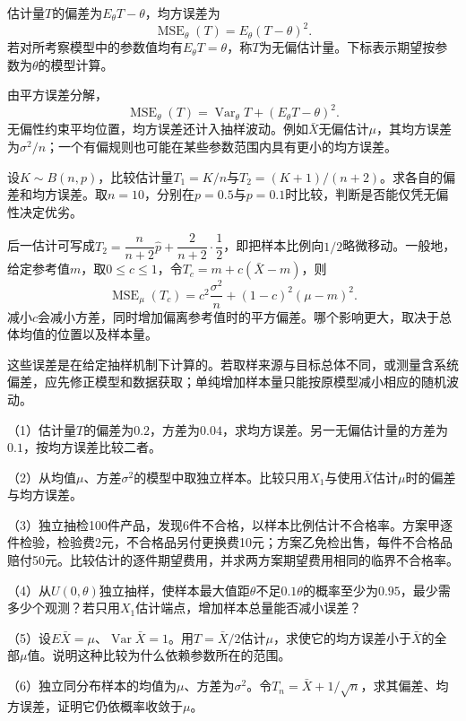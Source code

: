 \begin{definition}
估计量\(T\)的{\heiti 偏差}为\(E_\theta T-\theta\)，{\heiti 均方误差}为
\[
 \operatorname{MSE}_\theta(T)=E_\theta(T-\theta)^2.
\]
若对所考察模型中的参数值均有\(E_\theta T=\theta\)，称\(T\)为{\heiti 无偏估计量}。下标表示期望按参数为\(\theta\)的模型计算。
\end{definition}

由平方误差分解，
\begin{equation}\label{eq:prob-bias-variance}
 \operatorname{MSE}_\theta(T)=\operatorname{Var}_\theta T
 +(E_\theta T-\theta)^2.
\end{equation}
无偏性约束平均位置，均方误差还计入抽样波动。例如\(\bar X\)无偏估计\(\mu\)，其均方误差为\(\sigma^2/n\)；一个有偏规则也可能在某些参数范围内具有更小的均方误差。

\begin{example}
设\(K\sim B(n,p)\)，比较估计量\(T_1=K/n\)与\(T_2=(K+1)/(n+2)\)。求各自的偏差和均方误差。取\(n=10\)，分别在\(p=0.5\)与\(p=0.1\)时比较，判断是否能仅凭无偏性决定优劣。
\end{example}

后一估计可写成\(T_2=\dfrac n{n+2}\widehat p+\dfrac2{n+2}\cdot\dfrac12\)，即把样本比例向\(1/2\)略微移动。一般地，给定参考值\(m\)，取\(0\le c\le1\)，令\(T_c=m+c(\bar X-m)\)，则
\[
 \operatorname{MSE}_\mu(T_c)
 =c^2\frac{\sigma^2}n+(1-c)^2(\mu-m)^2.
\]
减小\(c\)会减小方差，同时增加偏离参考值时的平方偏差。哪个影响更大，取决于总体均值的位置以及样本量。

这些误差是在给定抽样机制下计算的。若取样来源与目标总体不同，或测量含系统偏差，应先修正模型和数据获取；单纯增加样本量只能按原模型减小相应的随机波动。

\begin{exercise}
\mbox{}\par\nobreak

（1）估计量\(T\)的偏差为\(0.2\)，方差为\(0.04\)，求均方误差。另一无偏估计量的方差为\(0.1\)，按均方误差比较二者。

（2）从均值\(\mu\)、方差\(\sigma^2\)的模型中取独立样本。比较只用\(X_1\)与使用\(\bar X\)估计\(\mu\)时的偏差与均方误差。

（3）独立抽检100件产品，发现6件不合格，以样本比例估计不合格率。方案甲逐件检验，检验费2元，不合格品另付更换费10元；方案乙免检出售，每件不合格品赔付50元。比较估计的逐件期望费用，并求两方案期望费用相同的临界不合格率。

（4）从\(U(0,\theta)\)独立抽样，使样本最大值距\(\theta\)不足\(0.1\theta\)的概率至少为\(0.95\)，最少需多少个观测？若只用\(X_1\)估计端点，增加样本总量能否减小误差？

（5）设\(E\bar X=\mu\)、\(\operatorname{Var}\bar X=1\)。用\(T=\bar X/2\)估计\(\mu\)，求使它的均方误差小于\(\bar X\)的全部\(\mu\)值。说明这种比较为什么依赖参数所在的范围。

（6）独立同分布样本的均值为\(\mu\)、方差为\(\sigma^2\)。令\(T_n=\bar X+1/\sqrt n\)，求其偏差、均方误差，证明它仍依概率收敛于\(\mu\)。
\end{exercise}

